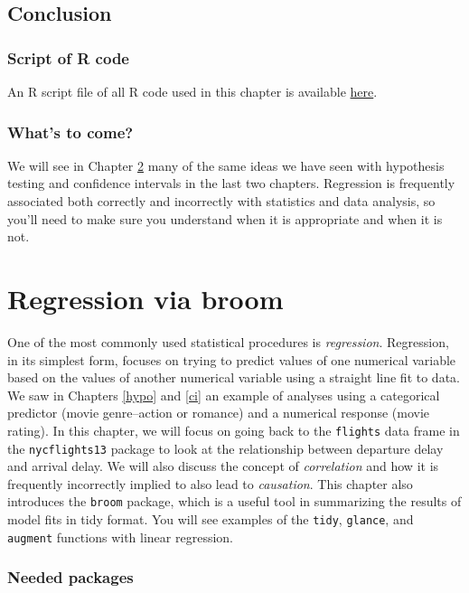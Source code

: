 \documentclass[]{tufte-book}
\begin{document}
\section{Conclusion}\label{conclusion-4}

\subsection{Script of R code}\label{script-of-r-code-4}

An R script file of all R code used in this chapter is available
\href{http://ismayc.github.io/moderndiver-book/scripts/08-ci.R}{here}.

\subsection{What's to come?}\label{whats-to-come-5}

We will see in Chapter \ref{regress} many of the same ideas we have seen
with hypothesis testing and confidence intervals in the last two
chapters. Regression is frequently associated both correctly and
incorrectly with statistics and data analysis, so you'll need to make
sure you understand when it is appropriate and when it is not.

\chapter{Regression via broom}\label{regress}

One of the most commonly used statistical procedures is
\emph{regression}. Regression, in its simplest form, focuses on trying
to predict values of one numerical variable based on the values of
another numerical variable using a straight line fit to data. We saw in
Chapters \ref{hypo} and \ref{ci} an example of analyses using a
categorical predictor (movie genre--action or romance) and a numerical
response (movie rating). In this chapter, we will focus on going back to
the \texttt{flights} data frame in the \texttt{nycflights13} package to
look at the relationship between departure delay and arrival delay. We
will also discuss the concept of \emph{correlation} and how it is
frequently incorrectly implied to also lead to \emph{causation}. This
chapter also introduces the \texttt{broom} package, which is a useful
tool in summarizing the results of model fits in tidy format. You will
see examples of the \texttt{tidy}, \texttt{glance}, and \texttt{augment}
functions with linear regression.

\subsection*{Needed packages}\label{needed-packages-6}
\end{document}
